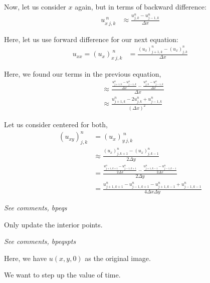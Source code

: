 \documentclass{article}
\begin{document}
Now, let us consider $x$ again, but in terms of backward difference:
%
\begin{align}
  u^{\ n}_{x\ j, k} & \approx \frac{u^n_{j, k} - u^n_{j - 1, k}}{\Delta x}
\end{align}


Here, let us use forward difference for our next equation:
%
\begin{align}
  u_{xx} = (u_x)^{\ n}_{x\ j,k}
  & = \frac{(u_x)^n_{j + 1, k} - (u_x)^n_{j, k}}{\Delta x}
\end{align}

Here, we found our terms in the previous equation,
%
\begin{align}
  & \approx
  \frac
  {
  \frac{u^n_{j+1, k} - u^n_{j - 1, k}}{\Delta x} -
  \frac{u^n_{j, k} - u^n_{j - 1, k}}{\Delta x}
  }
  {\Delta x}\\
  & \approx
  \frac
  {
  u^n_{j+1, k} - 2u^n_{j, k} + u^n_{j - 1, k}
  }
  {(\Delta x)^2}
\end{align}

\smallbreak

Let us consider centered for both,
%
\begin{align}
  (u_{xy})^n_{j, k} & = (u_x)^{\ n}_{y\ j, k}\\
  & \approx
  \frac
  {
  (u_x)^n_{j, k+1} - (u_x)^n_{j, k - 1}
  }
  {2 \Delta y}\\
  & =
  \frac
  {
  \frac{u^n_{j + 1, k+1} - u^n_{j-1, k+1}}{2\Delta x}
  -
  \frac{u^n_{j+1, k - 1} - u^n_{j - 1, k - 1}}{2 \Delta x}
  }
  {2\Delta y}\\
  & = \frac
  {
  u^n_{j+1, k+1} -
  u^n_{j-1, k+1} -
  u^n_{j+1, k-1} +
  u^n_{j-1, k-1}
  }
  {4 \Delta x \Delta y}
\end{align}


\emph{See comments, bpeqs}

Only update the interior points.


\emph{See comments, bpeqspts}

Here, we have $u(x, y, 0)$ as the original image.

We want to step up the value of time.
\end{document}
